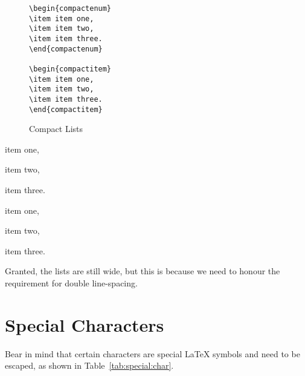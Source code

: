 \begin{figure}[htb!]
\begin{lstlisting}
\begin{compactenum}
\item item one,
\item item two,
\item item three.
\end{compactenum}

\begin{compactitem}
\item item one,
\item item two,
\item item three.
\end{compactitem}
\end{lstlisting}
\caption{Compact Lists}\label{fig:paralist}
\end{figure}


\begin{compactenum}
\item item one,
\item item two,
\item item three.
\end{compactenum}

\begin{compactitem}
\item item one,
\item item two,
\item item three.
\end{compactitem}

Granted, the lists are still wide, but this is because we need to honour the requirement for double line-spacing.

\section{Special Characters}

Bear in mind that certain characters are special \LaTeX{} symbols and need to be escaped, as shown in Table~\ref{tab:special:char}.

